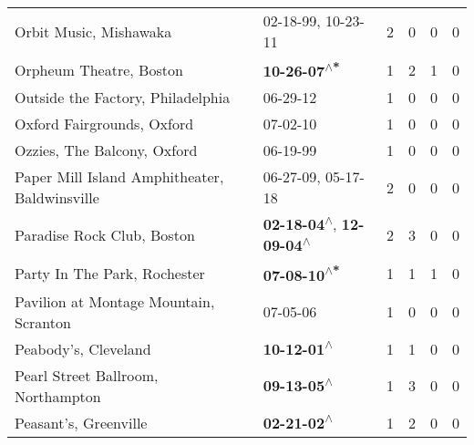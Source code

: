 \begin{supertabular}{p{0.4\textwidth}p{0.3\textwidth}p{0.05\textwidth}p{0.05\textwidth}p{0.05\textwidth}p{0.05\textwidth}}
                                                       Orbit Music, Mishawaka &                                      02-18-99\textsuperscript{}, 10-23-11\textsuperscript{} &  2 &  0 &  0 &  0 \\
                                                      Orpheum Theatre, Boston &                                                \textbf{10-26-07\textsuperscript{$\wedge$*}} &  1 &  2 &  1 &  0 \\
                                            Outside the Factory, Philadelphia &                                                                  06-29-12\textsuperscript{} &  1 &  0 &  0 &  0 \\
                                                   Oxford Fairgrounds, Oxford &                                                                  07-02-10\textsuperscript{} &  1 &  0 &  0 &  0 \\
                                                  Ozzies, The Balcony, Oxford &                                                                  06-19-99\textsuperscript{} &  1 &  0 &  0 &  0 \\
                                Paper Mill Island Amphitheater, Baldwinsville &                                      06-27-09\textsuperscript{}, 05-17-18\textsuperscript{} &  2 &  0 &  0 &  0 \\
                                                   Paradise Rock Club, Boston &    \textbf{02-18-04\textsuperscript{$\wedge$}}, \textbf{12-09-04\textsuperscript{$\wedge$}} &  2 &  3 &  0 &  0 \\
                                                 Party In The Park, Rochester &                                                \textbf{07-08-10\textsuperscript{$\wedge$*}} &  1 &  1 &  1 &  0 \\
                                       Pavilion at Montage Mountain, Scranton &                                                                  07-05-06\textsuperscript{} &  1 &  0 &  0 &  0 \\
                                                         Peabody's, Cleveland &                                                 \textbf{10-12-01\textsuperscript{$\wedge$}} &  1 &  1 &  0 &  0 \\
                                           Pearl Street Ballroom, Northampton &                                                 \textbf{09-13-05\textsuperscript{$\wedge$}} &  1 &  3 &  0 &  0 \\
                                                        Peasant's, Greenville &                                                 \textbf{02-21-02\textsuperscript{$\wedge$}} &  1 &  2 &  0 &  0 \\

\end{supertabular}
